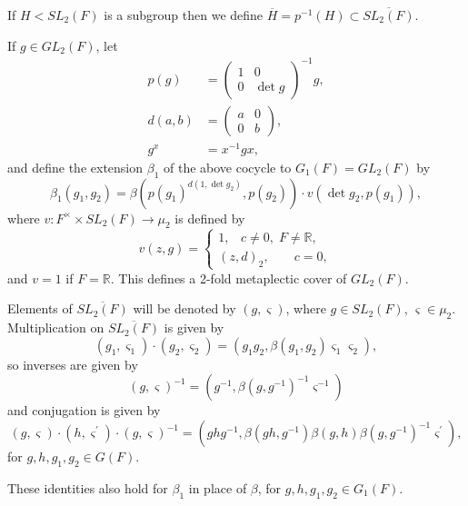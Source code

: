 \documentclass[12pt,letterpaper]{book}
\theoremstyle{plain}
\theoremstyle{definition}
\theoremstyle{remark}
\theoremstyle{remark}
\begin{document}
If $H<SL_2(F)$ is a subgroup then we define $\overline{H}=p^{-1}(H)\subset
\overline{SL_2(F)}$.

If $g\in GL_2(F)$, let
\begin{align*}
p(g) &=\left(
\begin{array}{cc}
1 & 0 \\
0 & \det g
\end{array}
\right) ^{-1}g, \\
d(a,b) &=\left(
\begin{array}{cc}
a & 0 \\
0 & b
\end{array}
\right) , \\
g^x &=x^{-1}gx,
\end{align*}
and define the extension $\beta _1$ of the above cocycle to
$G_1(F)=GL_2(F)$ by
\begin{equation}
\beta _1(g_1,g_2)=\beta (p(g_1)^{d(1,\det g_2)},p(g_2))\cdot v(\det
g_2,p(g_1)),\label{eq:beta1}
\end{equation}
where $v:F^{\times }\times SL_2(F)\rightarrow \mu_2$ is defined by
\[
v(z,g)=\left\{
\begin{array}{c}
1,\;\;\;c\neq 0,\;F\neq {\mathbb R}, \\
(z,d)_2,\;\;\;\;\;\;\;c=0,
\end{array}
\right.
\]
and $v=1$ if $F={\mathbb R}$. This defines a 2-fold metaplectic cover of
$GL_2(F)$.

Elements of $\overline{SL_2(F)}$ will be denoted by $(g,\varsigma )$,
where $g\in SL_2(F)$, $\varsigma \in \mu _2$.
Multiplication on $\overline{SL_2(F)}$ is given by
\begin{equation}
(g_1,\varsigma _1)\cdot (g_2,\varsigma _2)=(g_1g_2,\beta (g_1,g_2)\varsigma
_1\varsigma _2),\label{eq:mult}
\end{equation}
so inverses are given by
\begin{equation}
(g,\varsigma )^{-1}=(g^{-1},\beta (g,g^{-1})^{-1}\varsigma ^{-1})\label{eq:inv}
\end{equation}
and conjugation is given by
\begin{equation}
(g,\varsigma )\cdot (h,\varsigma ^{\prime })\cdot (g,\varsigma
)^{-1}=(ghg^{-1},\beta (gh,g^{-1})\beta (g,h)\beta (g,g^{-1})^{-1}\varsigma
^{\prime }),\label{eq:conj}
\end{equation}
for $g,h,g_1,g_2\in G(F)$.

These identities also hold for $\beta _1$ in place of $\beta$,
for $g,h,g_1,g_2\in G_1(F)$.
\end{document}
